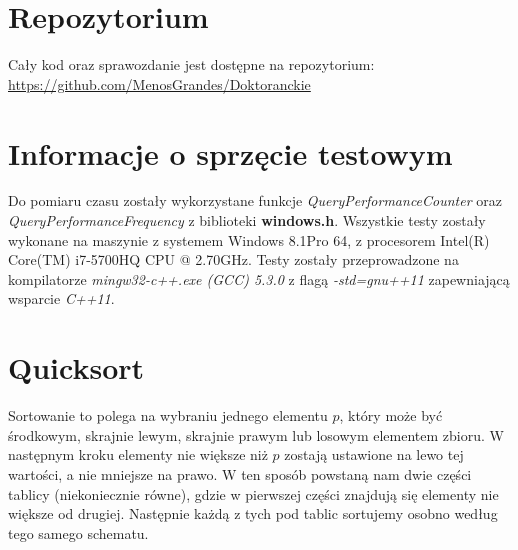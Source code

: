 
 \tableofcontents 
 \section{Repozytorium}
 Cały kod oraz sprawozdanie jest dostępne na repozytorium:
 \url{https://github.com/MenosGrandes/Doktoranckie}
\section{Informacje o sprzęcie testowym}
Do pomiaru czasu zostały wykorzystane funkcje \textit{QueryPerformanceCounter} oraz \textit{QueryPerformanceFrequency} z biblioteki \textbf{windows.h}. Wszystkie testy zostały wykonane na maszynie z systemem Windows 8.1Pro 64, z procesorem Intel(R) Core(TM) i7-5700HQ CPU @ 2.70GHz. Testy zostały przeprowadzone na kompilatorze \textit{mingw32-c++.exe (GCC) 5.3.0} z flagą \textit{-std=gnu++11} zapewniającą wsparcie \textit{C++11}.
\section{Quicksort}
Sortowanie to polega na wybraniu jednego elementu $p$, który może być środkowym, skrajnie lewym, skrajnie prawym lub losowym elementem zbioru. W następnym kroku elementy nie większe niż $p$ zostają ustawione na lewo tej wartości, a nie mniejsze na prawo. W ten sposób powstaną nam dwie części tablicy (niekoniecznie równe), gdzie w pierwszej części znajdują się elementy nie większe od drugiej. Następnie każdą z tych pod tablic sortujemy osobno według tego samego schematu. 
